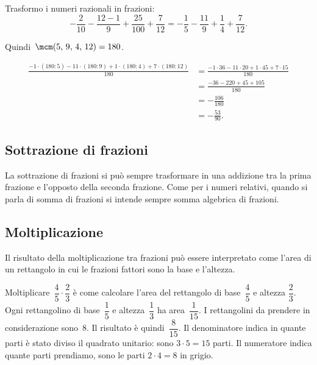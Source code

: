 \begin{exrig}
\begin{esempio}
Trasformo i numeri razionali in frazioni: 
\[-\frac{2}{10}-\frac{12-1}{9}+\frac{25}{100}+\frac{7}{12}=-\frac{1}{5}-\frac{11}{9}+\frac{1}{4}+\frac{7}{12}.\]

Quindi~$\mcm(5\text{,~}9\text{,~}4\text{,~}12)=180$.

\begin{align*}
\frac{-1\cdot(180:5)-11\cdot(180:9)+1\cdot(180:4)+7\cdot(180:12)}{180}&=
\frac{-1\cdot36-11\cdot20+1\cdot45+7\cdot15}{180}\\
&=\frac{-36-220+45+105}{180}\\
&=-\frac{106}{180} \\
&=-\frac{53}{90}.
\end{align*}
\end{esempio}
\end{exrig}

\subsection{Sottrazione di frazioni}

La sottrazione di frazioni si può sempre trasformare in una addizione tra la prima frazione e
l'opposto della seconda frazione. Come per i numeri relativi, quando si parla di
somma di frazioni si intende sempre somma algebrica di frazioni.

\vspazio\ovalbox{\risolvii \ref{ese:3.45}, \ref{ese:3.46}, \ref{ese:3.47}, \ref{ese:3.48}, \ref{ese:3.49}, \ref{ese:3.50}}

\subsection{Moltiplicazione}

Il risultato della moltiplicazione tra frazioni può essere interpretato come l'area di un rettangolo in cui
le frazioni fattori sono la base e l'altezza.
\begin{center}
 
\end{center}

Moltiplicare~$\dfrac{4}{5}\cdot\dfrac{2}{3}$ è come calcolare l'area del rettangolo di base~$\dfrac{4}{5}$ e altezza
$\dfrac{2}{3}$. 
Ogni rettangolino di base~$\dfrac{1}{5}$ e altezza~$\dfrac{1}{3}$ ha area~$\dfrac{1}{15}$.
I rettangolini da prendere in considerazione sono~8. Il risultato è quindi~$\dfrac{8}{15}$. 
Il denominatore indica in quante parti è stato diviso il quadrato unitario: sono $3 \cdot 5=15$ parti.
Il numeratore indica quante parti prendiamo, sono le parti $2\cdot 4=8$ in grigio. 

